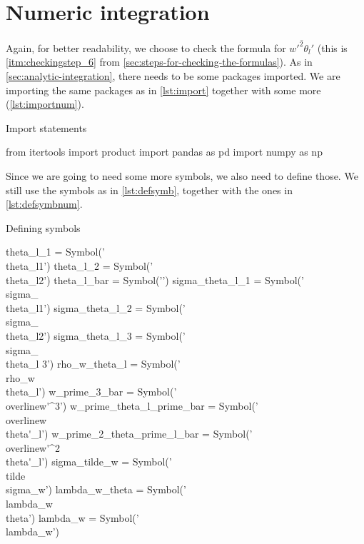 \section{Numeric integration}\label{sec:numeric-integration}

Again, for better readability, we choose to check the formula for $\overline{w'^2\theta_l'}$
(this is \cref{itm:checkingstep_6} from \cref{sec:steps-for-checking-the-formulas}).
As in \cref{sec:analytic-integration}, there needs to be some packages imported.
We are importing the same packages as in \cref{lst:import} together with some more (\cref{lst:importnum}).
\begin{listing}[!ht]
    \caption{Import statements}
    \label{lst:importnum}
    \begin{pythoncode}
        from itertools import product
        import pandas as pd
        import numpy as np
    \end{pythoncode}
\end{listing}
Since we are going to need some more symbols, we also need to define those.
We still use the symbols as in \cref{lst:defsymb}, together with the ones in \cref{lst:defsymbnum}.
\begin{listing}[!ht]
    \caption{Defining symbols}
    \label{lst:defsymbnum}
    \begin{pythoncode}
        theta_l_1 = Symbol('\\theta_{l1}') 
        theta_l_2 = Symbol('\\theta_{l2}')
        theta_l_bar = Symbol('')
        sigma_theta_l_1 = Symbol('\\sigma_{\\theta_{l1}}')
        sigma_theta_l_2 = Symbol('\\sigma_{\\theta_{l2}}')
        sigma_theta_l_3 = Symbol('\\sigma_{\\theta_l 3}')
        rho_w_theta_l = Symbol('\\rho_{w\\theta_l}')
        w_prime_3_bar = Symbol('\\overline{w\'^3}')
        w_prime_theta_l_prime_bar = Symbol('\\overline{w\'\\theta\'_l}')
        w_prime_2_theta_prime_l_bar = Symbol('\\overline{w\'^2\\theta\'_l}')
        sigma_tilde_w = Symbol('\\tilde{\\sigma}_w')
        lambda_w_theta = Symbol('\\lambda_{w\\theta}')
        lambda_w = Symbol('\\lambda_w')
    \end{pythoncode}
\end{listing}

